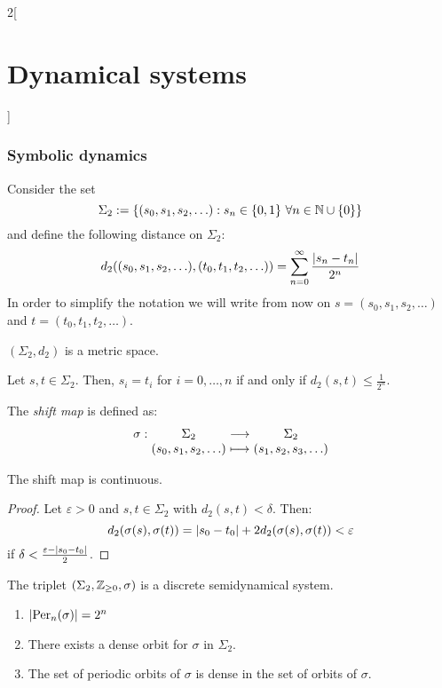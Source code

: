\documentclass[../../../main_math.tex]{subfiles}
\begin{document}
\begin{multicols}{2}[\section{Dynamical systems}]
  \subsubsection{Symbolic dynamics}
  \begin{definition}
    Consider the set $$\Sigma_2:=\{(s_0,s_1,s_2,\ldots):s_n\in\{0,1\}\ \forall n\in\NN\cup\{0\}\}$$ and define the following distance on $\Sigma_2$: $$d_2((s_0,s_1,s_2,\ldots),(t_0,t_1,t_2,\ldots))=\sum_{n=0}^\infty \frac{\abs{s_n-t_n}}{2^n}$$
    In order to simplify the notation we will write from now on $s=(s_0,s_1,s_2,\ldots)$ and $t=(t_0,t_1,t_2,\ldots)$.
  \end{definition}
  \begin{lemma}
    $(\Sigma_2,d_2)$ is a metric space.
  \end{lemma}
  \begin{proposition}
    Let $s, t\in\Sigma_2$. Then, $s_i=t_i$ for $i=0,\ldots,n$ if and only if $d_2(s,t)\leq \frac{1}{2^n}$.
  \end{proposition}
  \begin{definition}
    The \emph{shift map} is defined as:
    $$\function{\sigma}{\Sigma_2}{\Sigma_2}{(s_0,s_1,s_2,\ldots)}{(s_1,s_2,s_3,\ldots)}$$
  \end{definition}
  \begin{proposition}
    The shift map is continuous.
  \end{proposition}
  \begin{proof}
    Let $\varepsilon>0$ and $s,t\in\Sigma_2$ with $d_2(s,t)<\delta$. Then: $$d_2(\sigma(s),\sigma(t))=\abs{s_0-t_0} + 2d_2(\sigma(s),\sigma(t))<\varepsilon$$ if $\delta<\frac{\varepsilon - \abs{s_0-t_0}}{2}$.
  \end{proof}
  \begin{proposition}
    The triplet $(\Sigma_2, \mathbb{Z}_{\geq 0}, \sigma)$ is a discrete semidynamical system.
  \end{proposition}
  \begin{proposition}\hfill
    \begin{enumerate}
      \item $\abs{\operatorname{Per}_n(\sigma)}=2^n$
      \item There exists a dense orbit for $\sigma$ in $\Sigma_2$.
      \item The set of periodic orbits of $\sigma$ is dense in the set of orbits of $\sigma$.
    \end{enumerate}
  \end{proposition}
  \begin{sproof}

\end{sproof}
\end{multicols}
\end{document}
